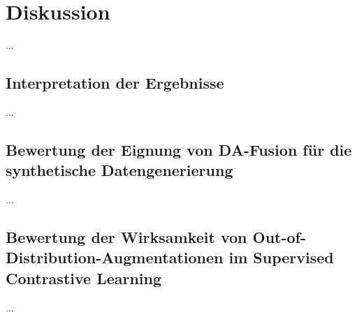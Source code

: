 \chapter{Diskussion}

...

\section{Interpretation der Ergebnisse}

...

\section{Bewertung der Eignung von DA-Fusion für die synthetische Datengenerierung}

...

\section{Bewertung der Wirksamkeit von Out-of-Distribution-Augmentationen im Supervised Contrastive Learning}

...
